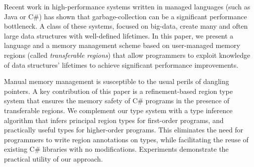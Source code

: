 Recent work in high-performance systems written in managed languages
(such as Java or C\#) has shown that garbage-collection can be a
significant performance bottleneck.  A class of these systems, focused
on big-data, create many and often large data structures with
well-defined lifetimes.  In this paper, we present a language and a
memory management scheme based on user-managed memory regions (called
\emph{transferable regions}) that allow programmers to exploit
knowledge of data structures' lifetimes to achieve significant
performance improvements.

Manual memory management is susceptible to the usual perils of
dangling pointers. A key contribution of this paper is a
refinement-based region type system that ensures the memory safety of
C\# programs in the presence of transferable regions. We complement
our type system with a type inference algorithm that infers principal
region types for first-order programs, and practically useful types
for higher-order programs. This eliminates the need for programmers to
write region annotations on types, while facilitating the reuse of
existing C\# libraries with no modifications. Experiments demonstrate
the practical utility of our approach.

